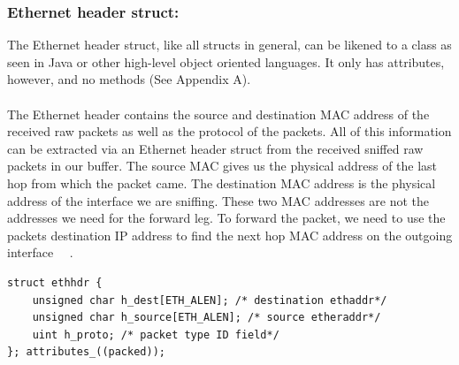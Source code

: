 \subsubsection*{Ethernet header struct:}
The Ethernet header struct, like all structs in general, can be likened to a class as seen in Java or other high-level object oriented languages. It only has attributes, however, and no methods (See Appendix A).  \\ 

\\

The Ethernet header contains the source and destination MAC address of the received raw packets as well as the protocol of the packets. All of this information can be extracted via an Ethernet header struct from the received sniffed raw packets in our buffer. The source MAC gives us the physical address of the last hop from which the packet came. The destination MAC address is the physical address of the interface we are sniffing. These two MAC addresses are not the addresses we need for the forward leg. To forward the packet, we need to use the packets destination IP address to find the next hop MAC address on the outgoing interface ~\cite{35}~\cite{38}.\\


\begin{lstlisting}
struct ethhdr {
    unsigned char h_dest[ETH_ALEN]; /* destination ethaddr*/
    unsigned char h_source[ETH_ALEN]; /* source etheraddr*/
    uint h_proto; /* packet type ID field*/
}; attributes_((packed));
\end{lstlisting}

